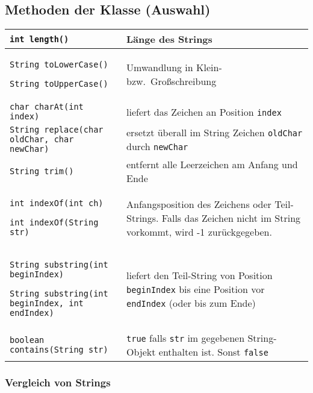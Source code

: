 \vfill

\subsection{Methoden der Klasse  (Auswahl)}


\begin{minipage}{1.0\textwidth} %

\bgroup
\def\arraystretch{1.2}
\begin{tabularx}{\textwidth}{|p{85mm}|X|}
\hline
\lstinline|int length()| & 
Länge des Strings
\\ \hline
\lstinline|String toLowerCase()|

\lstinline|String toUpperCase()| & 
Umwandlung in Klein- bzw.\ Großschreibung
\\ \hline
\lstinline|char charAt(int index)| & 
liefert das Zeichen an Position \lstinline|index|
\\ \hline
\lstinline|String replace(char oldChar, char newChar)| & 
ersetzt überall im String Zeichen \lstinline|oldChar| durch \lstinline|newChar|
\\ \hline
\lstinline|String trim()| & 
entfernt alle Leerzeichen am Anfang und Ende
\\ \hline
\lstinline|int indexOf(int ch)| 

\lstinline|int indexOf(String str)| & 
Anfangsposition des Zeichens oder Teil-Strings. Falls das Zeichen nicht im
String vorkommt, wird -1 zurückgegeben.
\\ \hline
\lstinline|String substring(int beginIndex)| 

\lstinline|String substring(int beginIndex, int endIndex)| & 
liefert den Teil-String von Position \lstinline|beginIndex| bis eine Position
vor \lstinline|endIndex| (oder bis zum Ende)
\\ \hline
\lstinline|boolean contains(String str)| & 
\lstinline|true| falls \lstinline|str| im gegebenen String-Objekt enthalten ist.
Sonst \lstinline|false|
\\ \hline
\end{tabularx}
\egroup

\subsubsection{Vergleich von Strings}


\end{minipage}
